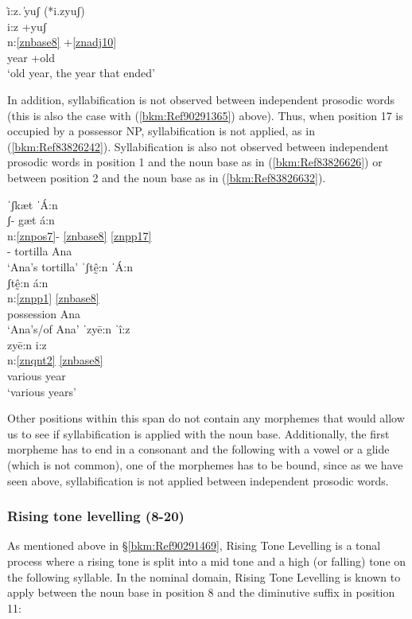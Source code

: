 \documentclass[output=paper]{langscibook}
\begin{document}
\ea\label{bkm:Ref90291365}
{̍i:z. ̍yuʃ  (*i.zyuʃ)} \\
\glll i:z +yuʃ\\
n:\ref{znbase8}  +\ref{znadj10}\\
year +old\\
\glt `old year, the year that ended'
\z

\begin{sloppypar}
In addition, syllabification is not observed between independent prosodic words (this is also the case with (\ref{bkm:Ref90291365}) above). Thus, when position 17 is occupied by a possessor NP, syllabification is not applied, as in (\ref{bkm:Ref83826242}). Syllabification is also not observed between independent prosodic words in position 1 and the noun base as in (\ref{bkm:Ref83826626}) or between position 2 and the noun base as in (\ref{bkm:Ref83826632}).
\end{sloppypar}

\ea\label{bkm:Ref83826242}
{ˈʃkæt ˈÁ:n}\\
\glll ʃ{}- gæt á:n\\
n:\ref{znpos7}- \ref{znbase8}  \ref{znpp17} \\
\Poss{}- tortilla Ana\\
\glt `Ana's tortilla'
\ex\label{bkm:Ref83826626}
{ˈʃtḛ̂:n ˈÁ:n}\\
\glll ʃtḛ̂:n á:n\\
n:\ref{znpp1} \ref{znbase8}\\
possession Ana\\
\glt `Ana's/of Ana'
\ex\label{bkm:Ref83826632}
{ˈzyē:n ˈî:z}\\
\glll zyē:n i:z\\
n:\ref{znqnt2} \ref{znbase8} \\
various year\\
\glt `various years'
\z

Other positions within this span do not contain any morphemes that would allow us to see if syllabification is applied with the noun base. Additionally, the first morpheme has to end in a consonant and the following with a vowel or a glide (which is not common), one of the morphemes has to be bound, since as we have seen above, syllabification is not applied between independent prosodic words. 

\subsubsection{Rising tone levelling (8-20)}\label{bkm:Ref83199039}
As mentioned above in §\ref{bkm:Ref90291469}, Rising Tone Levelling is a tonal process where a rising tone is split into a mid tone and a high (or falling) tone on the following syllable. In the nominal domain, Rising Tone Levelling is known to apply between the noun base in position 8 and the diminutive suffix in position 11:
\end{document}

